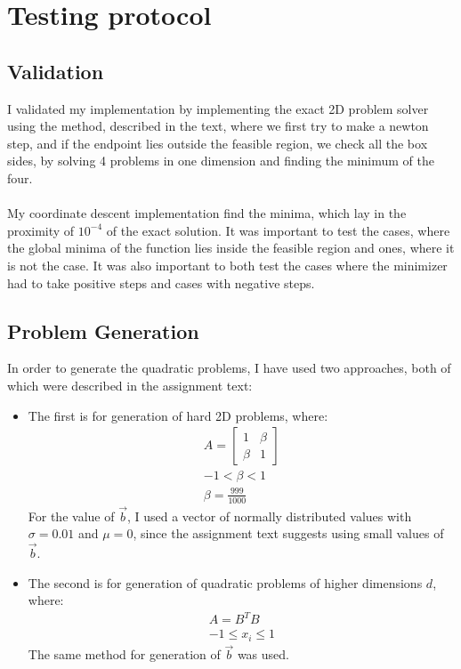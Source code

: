 \documentclass[a4paper]{article}
\begin{document}
\section{Testing protocol}
\subsection{Validation}
I validated my implementation by implementing the exact 2D problem solver using
the method, described in the text, where we first try to make a newton step, and
if the endpoint lies outside the feasible region, we check all the box sides, by
solving 4 problems in one dimension and finding the minimum of the four. \\\\
My coordinate descent implementation find the minima, which lay in the proximity
of $10^{-4}$ of the exact solution. It was important to test the cases, where
the global minima of the function lies inside the feasible region and ones,
where it is not the case. It was also important
to both test the cases where the minimizer had to take positive steps and cases with
negative steps.

\subsection{Problem Generation}
In order to generate the quadratic problems, I have used two approaches, both of
which were described in the assignment text:
\begin{itemize}
\item The first is for generation of hard 2D problems, where:
  \[
  \begin{aligned}
    A=\left[\begin{array}{ll}1 & \beta \\ \beta & 1\end{array}\right]\\
    -1 < \beta < 1 \\
    \beta = \frac{999}{1000}
  \end{aligned}
  \]
  For the value of $\vec{b}$, I used a vector of normally distributed values
  with $\sigma=0.01$ and $\mu=0$, since the assignment text suggests using small values of $\vec{b}$.
\item The second is for generation of quadratic problems of higher dimensions $d$, where:
  \[
  \begin{aligned}
    A = B^TB\\
    -1 \leq x_i \leq 1
  \end{aligned}
  \]
  The same method for generation of $\vec{b}$ was used.
\end{itemize}
\end{document}
